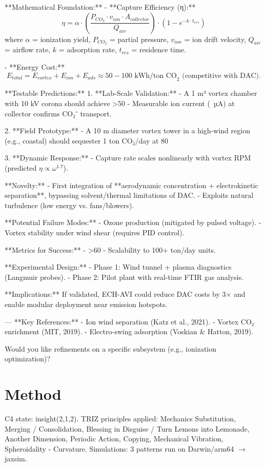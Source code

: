 \documentclass[12pt]{article}
\begin{document}
**Mathematical Foundation:**  
- **Capture Efficiency (η):**  
  \[
  \eta = \alpha \cdot \left( \frac{P_{CO_2} \cdot v_{ion} \cdot A_{collector}}{Q_{air}} \right) \cdot \left( 1 - e^{-k \cdot t_{res}} \right)
  \]  
  where \( \alpha \) = ionization yield, \( P_{CO_2} \) = partial pressure, \( v_{ion} \) = ion drift velocity, \( Q_{air} \) = airflow rate, \( k \) = adsorption rate, \( t_{res} \) = residence time.  

- **Energy Cost:**  
  \[
  E_{total} = E_{vortex} + E_{ion} + E_{ads} \approx 50-100 \text{ kWh/ton CO}_2 \text{ (competitive with DAC)}.
  \]  

**Testable Predictions:**  
1. **Lab-Scale Validation:**  
   - A 1 m³ vortex chamber with 10 kV corona should achieve >50%
   - Measurable ion current (~µA) at collector confirms CO₂⁻ transport.  

2. **Field Prototype:**  
   - A 10 m diameter vortex tower in a high-wind region (e.g., coastal) should sequester 1 ton CO₂/day at 80%

3. **Dynamic Response:**  
   - Capture rate scales nonlinearly with vortex RPM (predicted \( \eta \propto \omega^{1.7} \)).  

**Novelty:**  
- First integration of **aerodynamic concentration + electrokinetic separation**, bypassing solvent/thermal limitations of DAC.  
- Exploits natural turbulence (low energy vs. fans/blowers).  

**Potential Failure Modes:**  
- Ozone production (mitigated by pulsed voltage).  
- Vortex stability under wind shear (requires PID control).  

**Metrics for Success:**  
- >60%
- Scalability to 100+ ton/day units.  

**Experimental Design:**  
- Phase 1: Wind tunnel + plasma diagnostics (Langmuir probes).  
- Phase 2: Pilot plant with real-time FTIR gas analysis.  

**Implications:**  
If validated, ECH-AVI could reduce DAC costs by 3× and enable modular deployment near emission hotspots.  

---  
**Key References:**  
- Ion wind separation (Katz et al., 2021).  
- Vortex CO₂ enrichment (MIT, 2019).  
- Electro-swing adsorption (Voskian & Hatton, 2019).  

Would you like refinements on a specific subsystem (e.g., ionization optimization)?
\section{Method}
C4 state: insight(2,1,2). TRIZ principles applied: Mechanics Substitution, Merging / Consolidation, Blessing in Disguise / Turn Lemons into Lemonade, Another Dimension, Periodic Action, Copying, Mechanical Vibration, Spheroidality - Curvature.
Simulations: 3 patterns run on Darwin/arm64 $\rightarrow$ jaxsim.
\end{document}
